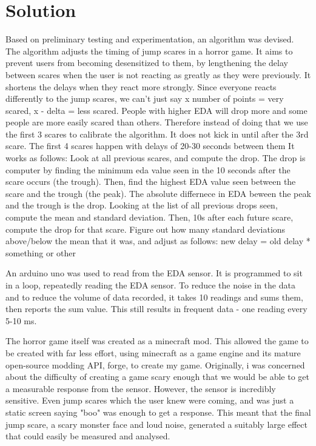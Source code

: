 \documentclass[12pt,a4paper]{article}\usepackage[]{graphicx}\usepackage[]{color}
\begin{document}
\section{Solution}

Based on preliminary testing and experimentation, an algorithm was devised.
The algorithm adjusts the timing of jump scares in a horror game.
It aims to prevent users from becoming desensitized to them, by lengthening the delay between scares when the user is not reacting as greatly as they were previously. It shortens the delays when they react more strongly.
Since everyone reacts differently to the jump scares, we can't just say x number of points = very scared, x - delta = less scared.
People with higher EDA will drop more and some people are more easily scared than others.
Therefore instead of doing that we use the first 3 scares to calibrate the algorithm.
It does not kick in until after the 3rd scare.
The first 4 scares happen with delays of 20-30 seconds between them
It works as follows:
Look at all previous scares, and compute the drop. The drop is computer by finding the minimum eda value seen in the 10 seconds after the scare occurs (the trough).
Then, find the highest EDA value seen between the scare and the trough (the peak). The absolute differnece in EDA beween the peak and the trough is the drop.
Looking at the list of all previous drops seen, compute the mean and standard deviation. Then, 10s after each future scare, compute the drop for that scare. Figure out how many standard deviations above/below the mean that it was, and adjust as follows:
new delay = old delay * something or other %

An arduino uno was used to read from the EDA sensor.
It is programmed to sit in a loop, repeatedly reading the EDA sensor.
To reduce the noise in the data and to reduce the volume of data recorded, it takes 10 readings and sums them, then reports the sum value. This still results in frequent data - one reading every 5-10 ms.

The horror game itself was created as a minecraft mod.
This allowed the game to be created with far less effort, using minecraft as a game engine and its mature open-source modding API, forge, to create my game.
Originally, i was concerned about the difficulty of creating a game scary enough that we would be able to get a measurable response from the sensor.
However, the sensor is incredibly sensitive.
Even jump scares which the user knew were coming, and was just a static screen saying "boo" was enough to get a response.
This meant that the final jump scare, a scary monster face and loud noise, generated a suitably large effect that could easily be measured and analysed.
\end{document}
